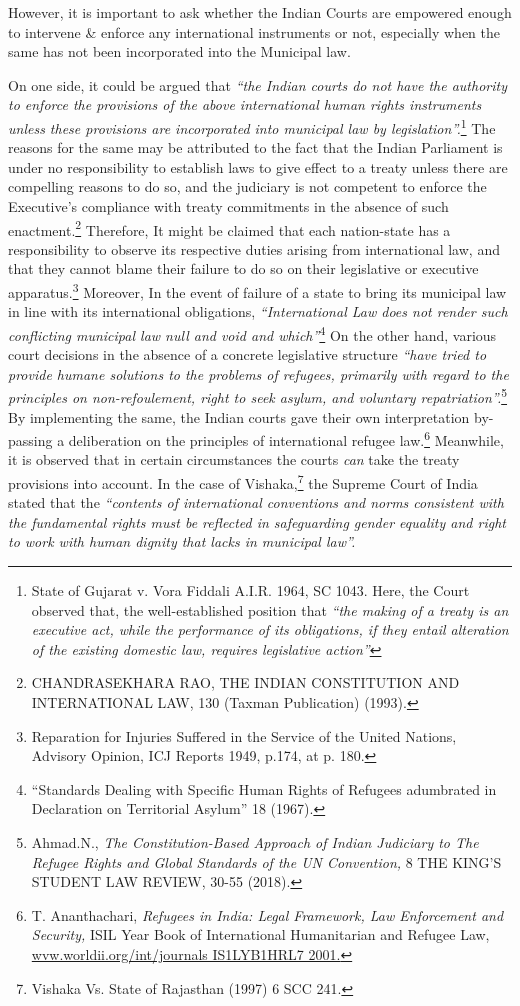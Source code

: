 \begin{multicols}{2}
\noi
However, it is important to ask whether the Indian Courts are empowered enough to intervene
\& enforce any international instruments or not, especially when the same has not been
incorporated into the Municipal law.

\noi
On one side, it could be argued that \textit{“the Indian courts do not have the authority to enforce
the provisions of the above international human rights instruments unless these provisions are
incorporated into municipal law by legislation”.}\footnote{State of Gujarat v. Vora Fiddali A.I.R. 1964, SC 1043. Here, the Court observed that, the well-established position that \textit{“the making of a treaty is an executive act, while the performance of its obligations, if they entail alteration of the existing domestic law, requires legislative action”}} The reasons for the same may be attributed
to the fact that the Indian Parliament is under no responsibility to establish laws to give effect
to a treaty unless there are compelling reasons to do so, and the judiciary is not competent to
enforce the Executive's compliance with treaty commitments in the absence of such
enactment.\footnote{CHANDRASEKHARA RAO, THE INDIAN CONSTITUTION AND INTERNATIONAL LAW, 130
(Taxman Publication) (1993).}  Therefore, It might be claimed that each nation-state has a responsibility to
observe its respective duties arising from international law, and that they cannot blame their
failure to do so on their legislative or executive apparatus.\footnote{Reparation for Injuries Suffered in the Service of the United Nations, Advisory Opinion, ICJ Reports 1949, p.174, at p. 180.}  Moreover, In the event of failure
of a state to bring its municipal law in line with its international obligations, \textit{“International Law does not render such conflicting municipal law null and void and which”}\footnote{“Standards Dealing with Specific Human Rights of Refugees adumbrated in Declaration on Territorial Asylum” 18 (1967).}  On the other hand, various court decisions in the absence of a concrete legislative structure \textit{“have tried to provide humane solutions to the problems of refugees, primarily with regard to the principles on non-refoulement, right to seek asylum, and voluntary repatriation”.}\footnote{Ahmad.N., \textit{The Constitution-Based Approach of Indian Judiciary to The Refugee Rights and Global Standards of the UN Convention,} 8 THE KING’S STUDENT LAW REVIEW, 30-55 (2018).} By implementing the same, the Indian courts gave their own interpretation by-passing a deliberation on the
principles of international refugee law.\footnote{T. Ananthachari, \textit{Refugees in India: Legal Framework, Law Enforcement and Security,} ISIL Year Book of International Humanitarian and Refugee Law, \url{wvw.worldii.org/int/journals IS1LYB1HRL7 2001.}} Meanwhile, it is observed that in certain
circumstances the courts \textit{can} take the treaty provisions into account. In the case of Vishaka,\footnote{Vishaka Vs. State of Rajasthan (1997) 6 SCC 241.} the Supreme Court of India stated that the \textit{“contents of international conventions and norms
consistent with the fundamental rights must be reflected in safeguarding gender equality and
right to work with human dignity that lacks in municipal law”.}


\end{multicols}
